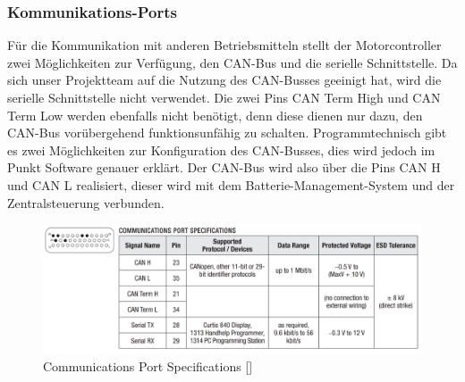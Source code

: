 \newpage


\subsubsection{Kommunikations-Ports}
\label{Kommunikations-Ports}
Für die Kommunikation mit anderen Betriebsmitteln stellt der Motorcontroller zwei Möglichkeiten zur Verfügung, den CAN-Bus und die serielle Schnittstelle. Da sich unser Projektteam auf die Nutzung des CAN-Busses geeinigt hat, wird die serielle Schnittstelle nicht verwendet. Die zwei Pins \glqq CAN Term High\grqq{} und \glqq CAN Term Low\grqq{} werden ebenfalls nicht benötigt, denn diese dienen nur dazu, den CAN-Bus vorübergehend funktionsunfähig zu schalten. Programmtechnisch gibt es zwei Möglichkeiten zur Konfiguration des CAN-Busses, dies wird jedoch im Punkt Software genauer erklärt. Der CAN-Bus wird also über die Pins \glqq CAN H\grqq{} und \glqq CAN L\grqq{} realisiert, dieser wird mit dem Batterie-Management-System und der Zentralsteuerung verbunden.

\begin{figure}[H]
	\begin{center}
		\includegraphics[width=\textwidth]{figures/antrieb/Communications_Port_Specifications.png}
		\caption{Communications Port Specifications [\cite{Manual}]}
	\end{center}
\end{figure}



\newpage


